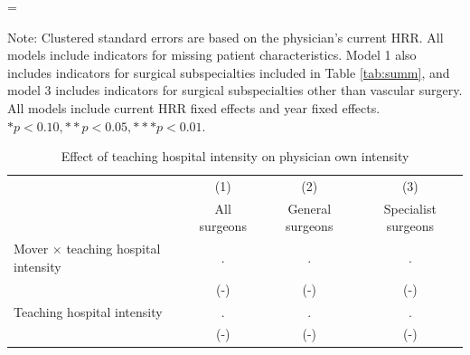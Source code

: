\setlength{\LTpost}{0mm}
\LTcapwidth=\textwidth
\begin{ThreePartTable}
\begin{TableNotes}
    Note: Clustered standard errors are based on the physician's current HRR. All models include indicators for missing patient characteristics. Model 1 also includes indicators for surgical subspecialties included in Table \ref{tab:summ}, and model 3 includes indicators for surgical subspecialties other than vascular surgery. All models include current HRR fixed effects and year fixed effects. $* p < 0.10, ** p < 0.05, *** p < 0.01$.
\end{TableNotes}
\begin{longtable}{lccc}
    \label{tab:res-location} \\
    \caption{Effect of teaching hospital intensity on physician own intensity} \\
        \toprule
         & (1) & (2) & (3) \\
         & All surgeons & General surgeons & Specialist surgeons \\
        \midrule
        Mover $\times$ teaching hospital intensity & . & . & . \\
         & (-) & (-) & (-) \\
        Teaching hospital intensity & . & . & . \\
         & (-) & (-) & (-) \\

\end{longtable}
\end{ThreePartTable}
